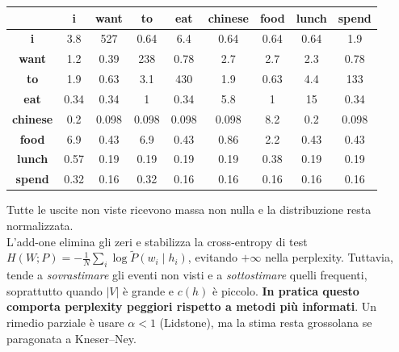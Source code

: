         \begin{center}
            \begin{tabular}{|c|c|c|c|c|c|c|c|c|}
                \hline
                 & \textbf{i} & \textbf{want} & \textbf{to} & \textbf{eat} & \textbf{chinese} & \textbf{food} & \textbf{lunch} & \textbf{spend} \\ \hline
                \textbf{i} & 3.8 & 527 & {\color{blue}0.64} & 6.4 & {\color{blue}0.64} & {\color{blue}0.64} & {\color{blue}0.64} & 1.9 \\ 
                \textbf{want} & 1.2 & {\color{blue}0.39} & 238 & 0.78 & 2.7 & 2.7 & 2.3 & 0.78 \\ 
                \textbf{to} & 1.9 & {\color{blue}0.63} & 3.1 & 430 & 1.9 & {\color{blue}0.63} & 4.4 & 133 \\ 
                \textbf{eat} & {\color{blue}0.34} & {\color{blue}0.34} & 1 & {\color{blue}0.34} & 5.8 & 1 & 15 & {\color{blue}0.34} \\ 
                \textbf{chinese} & 0.2 & {\color{blue}0.098} & {\color{blue}0.098} & {\color{blue}0.098} & {\color{blue}0.098} & 8.2 & 0.2 & {\color{blue}0.098} \\ 
                \textbf{food} & 6.9 & {\color{blue}0.43} & 6.9 & {\color{blue}0.43} & 0.86 & 2.2 & {\color{blue}0.43} & {\color{blue}0.43} \\ 
                \textbf{lunch} & 0.57 & {\color{blue}0.19} & {\color{blue}0.19} & {\color{blue}0.19} & {\color{blue}0.19} & 0.38 & {\color{blue}0.19} & {\color{blue}0.19} \\ 
                \textbf{spend} & 0.32 & {\color{blue}0.16} & 0.32 & {\color{blue}0.16} & {\color{blue}0.16} & {\color{blue}0.16} & {\color{blue}0.16} & {\color{blue}0.16} \\ \hline
            \end{tabular}
        \end{center}
        
        Tutte le uscite non viste ricevono massa non nulla e la distribuzione resta normalizzata.\\
        
        L'add-one elimina gli zeri e stabilizza la cross-entropy di test $H(W;P)=-\tfrac{1}{N}\sum_i \log \tilde P(w_i\mid h_i)$, evitando $+\infty$ nella perplexity. Tuttavia, tende a \textit{sovrastimare} gli eventi non visti e a \textit{sottostimare} quelli frequenti, soprattutto quando $|V|$ è grande e $c(h)$ è piccolo. \textbf{In pratica questo comporta perplexity peggiori rispetto a metodi più informati}. Un rimedio parziale è usare $\alpha<1$ (Lidstone), ma la stima resta grossolana se paragonata a Kneser--Ney.
        

